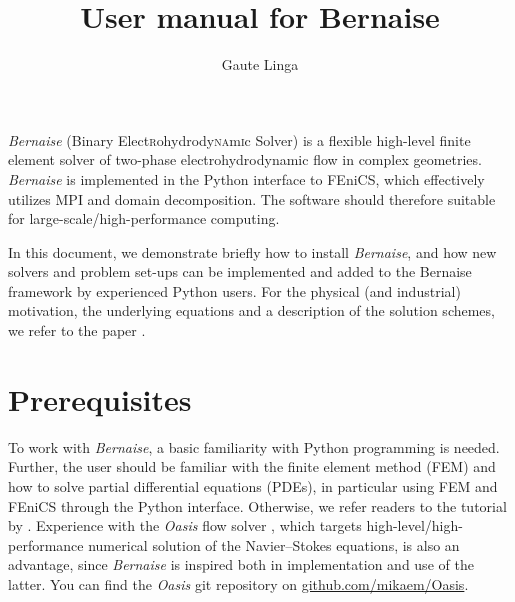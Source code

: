 \documentclass[a4paper,10pt]{article}
\title{User manual for Bernaise}
\author{Gaute Linga}
\begin{document}
\maketitle

\emph{Bernaise} (Binary Elect\textsc{r}ohydrody\textsc{na}m\textsc{i}c Solver) is a flexible high-level finite element solver of two-phase electrohydrodynamic flow in complex geometries.
\emph{Bernaise} is implemented in the Python interface to FEniCS, which effectively utilizes MPI and domain decomposition.
The software should therefore suitable for large-scale/high-performance computing.

In this document, we demonstrate briefly how to install \emph{Bernaise}, and how new solvers and problem set-ups can be implemented and added to the Bernaise framework by experienced Python users.
For the physical (and industrial) motivation, the underlying equations and a description of the solution schemes, we refer to the paper \cite{linga2018b}.

\section{Prerequisites}
To work with \emph{Bernaise}, a basic familiarity with Python programming is needed.
Further, the user should be familiar with the finite element method (FEM) and how to solve partial differential equations (PDEs), in particular using FEM and FEniCS through the Python interface.
Otherwise, we refer readers to the tutorial by \citet{langtangen2017}.
Experience with the \emph{Oasis} flow solver \cite{mortensen2015}, which targets high-level/high-performance numerical solution of the Navier--Stokes equations, is also an advantage, since \emph{Bernaise} is inspired both in implementation and use of the latter.
You can find the \emph{Oasis} git repository on \url{github.com/mikaem/Oasis}.
\end{document}
